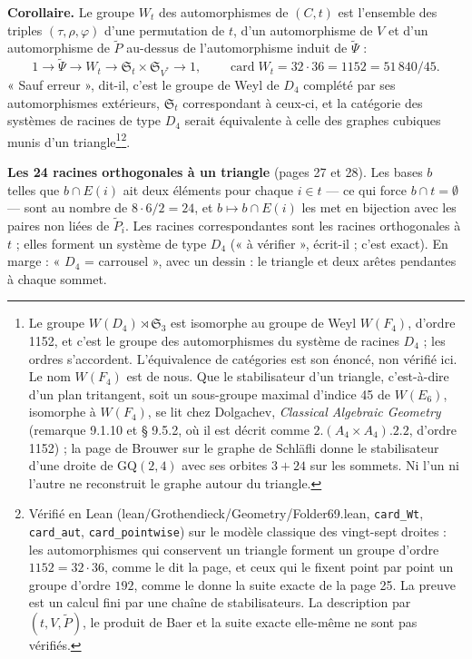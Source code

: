 \documentclass[11pt,a4paper]{article}
\begin{document}
\textbf{Corollaire.} Le groupe $W_t$ des automorphismes de $(C, t)$ est
l'ensemble des triples $(\tau, \rho, \varphi)$ d'une permutation de $t$, d'un
automorphisme de $V$ et d'un automorphisme de $\widetilde P$ au-dessus de
l'automorphisme induit de $\widetilde\Psi$ :
\[
1 \to \widetilde\Psi \to W_t \to \mathfrak{S}_t \times \mathfrak{S}_{V^*} \to 1,
\qquad \operatorname{card} W_t = 32 \cdot 36 = 1152 = 51\,840/45 .
\]
« Sauf erreur », dit-il, c'est le groupe de Weyl de $D_4$ complété par ses
automorphismes extérieurs, $\mathfrak{S}_t$ correspondant à ceux-ci, et la
catégorie des systèmes de racines de type $D_4$ serait équivalente à celle des
graphes cubiques munis d'un triangle\footnote{Le groupe $W(D_4) \rtimes
\mathfrak{S}_3$ est isomorphe au groupe de Weyl $W(F_4)$, d'ordre 1152, et
c'est le groupe des automorphismes du système de racines $D_4$ ; les ordres
s'accordent. L'équivalence de catégories est son énoncé, non vérifié ici. Le
nom $W(F_4)$ est de nous. Que le stabilisateur d'un triangle, c'est-à-dire d'un
plan tritangent, soit un sous-groupe maximal d'indice 45 de $W(E_6)$, isomorphe
à $W(F_4)$, se lit chez Dolgachev, \emph{Classical Algebraic Geometry}
(remarque 9.1.10 et § 9.5.2, où il est décrit comme $2.(A_4 \times A_4).2.2$,
d'ordre 1152) ; la page de Brouwer sur le graphe de Schläfli donne le
stabilisateur d'une droite de $\mathrm{GQ}(2, 4)$ avec ses orbites $3 + 24$ sur
les sommets. Ni l'un ni l'autre ne reconstruit le graphe autour du
triangle.}\footnote{Vérifié en Lean (lean/Grothendieck/Geometry/Folder69.lean,
\texttt{card\_Wt}, \texttt{card\_aut}, \texttt{card\_pointwise}) sur le
modèle classique des vingt-sept droites : les automorphismes qui conservent un
triangle forment un groupe d'ordre $1152 = 32 \cdot 36$, comme le dit la page,
et ceux qui le fixent point par point un groupe d'ordre $192$, comme le donne
la suite exacte de la page 25. La preuve est un calcul fini par une chaîne de
stabilisateurs. La description par $(t, V, \widetilde P)$, le produit de Baer
et la suite exacte elle-même ne sont pas vérifiés.}.

\textbf{Les 24 racines orthogonales à un triangle} (pages 27 et 28). Les bases
$b$ telles que $b \cap E(i)$ ait deux éléments pour chaque $i \in t$ --- ce
qui force $b \cap t = \emptyset$ --- sont au nombre de $8 \cdot 6/2 = 24$, et
$b \mapsto b \cap E(i)$ les met en bijection avec les paires non liées de
$\widetilde P_i$. Les racines correspondantes sont les racines orthogonales à
$t$ ; elles forment un système de type $D_4$ (« à vérifier », écrit-il ; c'est
exact). En marge : « $D_4$ = carrousel », avec un dessin : le triangle et deux
arêtes pendantes à chaque sommet.
\end{document}

